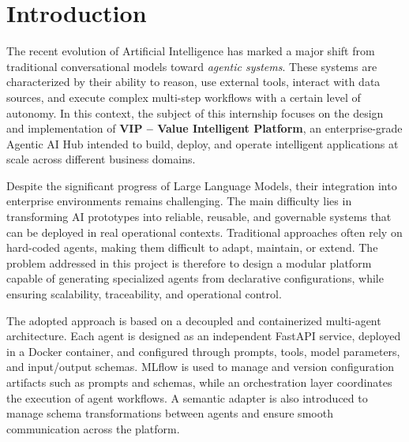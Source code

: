 
\clearpage
{}
\setcounter{page}{1}
\section*{Introduction}
{}

The recent evolution of Artificial Intelligence has marked a major shift from traditional conversational models toward \textit{agentic systems}. These systems are characterized by their ability to reason, use external tools, interact with data sources, and execute complex multi-step workflows with a certain level of autonomy. In this context, the subject of this internship focuses on the design and implementation of \textbf{VIP -- Value Intelligent Platform}, an enterprise-grade Agentic AI Hub intended to build, deploy, and operate intelligent applications at scale across different business domains.

\vspace{1em}

Despite the significant progress of Large Language Models, their integration into enterprise environments remains challenging. The main difficulty lies in transforming AI prototypes into reliable, reusable, and governable systems that can be deployed in real operational contexts. Traditional approaches often rely on hard-coded agents, making them difficult to adapt, maintain, or extend. The problem addressed in this project is therefore to design a modular platform capable of generating specialized agents from declarative configurations, while ensuring scalability, traceability, and operational control.

\vspace{1em}

The adopted approach is based on a decoupled and containerized multi-agent architecture. Each agent is designed as an independent FastAPI service, deployed in a Docker container, and configured through prompts, tools, model parameters, and input/output schemas. MLflow is used to manage and version configuration artifacts such as prompts and schemas, while an orchestration layer coordinates the execution of agent workflows. A semantic adapter is also introduced to manage schema transformations between agents and ensure smooth communication across the platform.

\vspace{1em}

